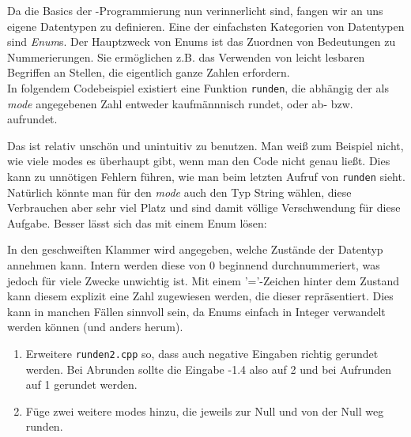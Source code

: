 
Da die Basics der \Cpp-Programmierung nun verinnerlicht sind, fangen wir an uns eigene Datentypen zu definieren.
Eine der einfachsten Kategorien von Datentypen sind \emph{Enum}s. Der Hauptzweck von Enums ist das Zuordnen von Bedeutungen zu Nummerierungen.
Sie ermöglichen z.B. das Verwenden von leicht lesbaren Begriffen an Stellen, die eigentlich ganze Zahlen erfordern. \\
In folgendem Codebeispiel existiert eine Funktion \texttt{runden}, die abhängig der als \emph{mode} angegebenen Zahl entweder kaufmännnisch rundet, oder ab- bzw. aufrundet.


Das ist relativ unschön und unintuitiv zu benutzen. Man weiß zum Beispiel nicht, wie viele modes es überhaupt gibt, wenn man den Code nicht genau ließt. Dies kann zu unnötigen Fehlern führen, wie man beim letzten Aufruf von \texttt{runden} sieht. Natürlich könnte man für den \emph{mode} auch den Typ String wählen, diese Verbrauchen aber sehr viel Platz und sind damit völlige Verschwendung für diese Aufgabe. Besser lässt sich das mit einem Enum lösen:


In den geschweiften Klammer wird angegeben, welche Zustände der Datentyp annehmen kann.
Intern werden diese von 0 beginnend durchnummeriert, was jedoch für viele Zwecke unwichtig ist.
Mit einem '='-Zeichen hinter dem Zustand kann diesem explizit eine Zahl zugewiesen werden, die dieser repräsentiert.
Dies kann in manchen Fällen sinnvoll sein, da Enums einfach in Integer verwandelt werden können (und anders herum).

\begin{praxis}
    \begin{enumerate}
        \item Erweitere \texttt{runden2.cpp} so, dass auch negative Eingaben richtig gerundet werden. Bei Abrunden sollte die Eingabe -1.4 also auf 2 und bei Aufrunden auf 1 gerundet werden.
        \item Füge zwei weitere modes hinzu, die jeweils zur Null und von der Null weg runden.
    \end{enumerate}
\end{praxis}